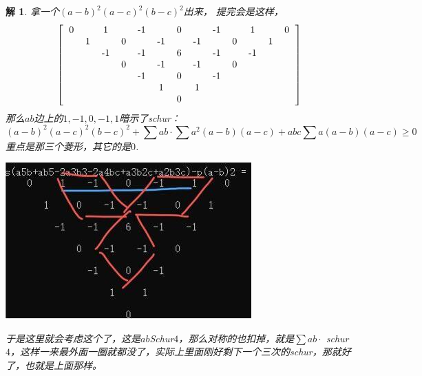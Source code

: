 \documentclass[UTF8]{ctexart}
\newtheorem{2}{解}
\begin{document}
\begin{2}
拿一个$ (a-b)^{2}(a-c)^{2}(b-c)^{2} $出来，
提完会是这样，\textnormal{
\renewcommand*{\arraystretch}{1.732}\[\left[\begin{matrix}
	\begin{tabular}{ccccccccccccc}
		0&  &1  &  & -1 &  & 0 &  & -1 &  & 1 &  & 0\\
		&1  &  & 0 &  & -1 &  & -1 &  & 0 &  & 1 & \\
		&  & -1 &  & -1 &  &  6&  &  -1&  &  -1&  & \\
		&  &  &  0 &  & -1 &  & -1 &  & 0  &  &  & \\
		&  &  &  &  -1&  &0  &  & -1 &  &  &  & \\
		&  &  &  &  &  1&  &1  &  &  &  &  & \\
		&  &  &  &  &  &  0&  &  &  &  &  & \\
	\end{tabular}
\end{matrix}\right]\]}
那么$ ab $边上的$ 1,-1,0,-1,1 $暗示了schur：
$$ (a-b)^{2}(a-c)^{2}(b-c)^{2}+\displaystyle \sum ab \cdot \displaystyle \sum a^{2}(a-b)(a-c)+abc \displaystyle \sum a(a-b)(a-c) \geq 0 $$
重点是那三个菱形，其它的是$ 0 $.
\begin{center}
	\includegraphics[width=0.5\linewidth]{0210}
\end{center}

于是这里就会考虑这个了，这是$ab$Schur$4 $，那么对称的也扣掉，就是$ \displaystyle \sum ab·$ schur $4 $，这样一来最外面一圈就都没了，实际上里面刚好剩下一个三次的schur，那就好了，也就是上面那样。
\\
\end{2}
\end{document}
